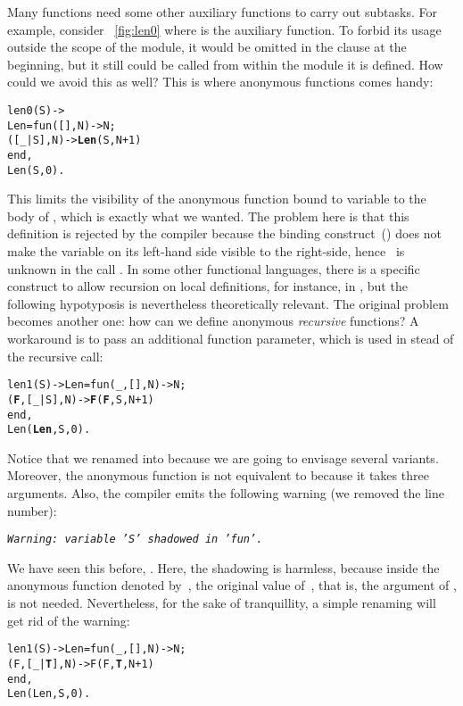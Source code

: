 Many functions need some other auxiliary functions to carry out
subtasks. For example, consider \fig~\vref{fig:len0} where
 is the auxiliary function. To forbid its usage
outside the scope of the module, it would be omitted in the
 clause at the beginning, but it still could be
called from within the module it is defined. How could we avoid this
as well? This is where anonymous functions comes handy:
\begin{alltt}
len0(S) -> 
  Len = fun(   [],N) -> N;
           ([\_|S],N) -> \textbf{Len}(S,N+1)\hfill% \emph{Does not compile}
        end,
  Len(S,0).
\end{alltt}
This limits the visibility of the anonymous function bound to variable
 to the body of , which is exactly what
we wanted. The problem here is that this definition is rejected by the
\Erlang compiler because the binding construct~(\erlcode{=}) does not
make the variable on its left\hyp{}hand side visible to the
right\hyp{}side, hence ~is unknown in the call
. In some other functional languages, there is a
specific construct to allow recursion on local definitions, for
instance,  in \OCaml, but the following hypotyposis
is nevertheless theoretically relevant. The original problem becomes
another one: how can we define anonymous \emph{recursive} functions? A
workaround is to pass an additional function parameter, which is used
in stead of the recursive call:
\begin{alltt}
len1(S) -> Len = fun(\_,   [],N) -> N;
                    (\textbf{F},[\_|S],N) -> \textbf{F}(\textbf{F},S,N+1)
                 end,
           Len(\textbf{Len},S,0).
\end{alltt}
Notice that we renamed  into 
because we are going to envisage several variants. Moreover, the
anonymous function is not equivalent to  because it
takes three arguments. Also, the compiler emits the following warning
(we removed the line number):
\begin{center}
\emph{\texttt{Warning: variable 'S' shadowed in 'fun'.}}
\end{center}
We have seen this before, . Here, the shadowing is
harmless, because inside the anonymous function denoted
by~, the original value of~, that is, the
argument of , is not needed. Nevertheless, for the
sake of tranquillity, a simple renaming will get rid of the warning:
\begin{alltt}
len1(S) -> Len = fun(\_,   [],N) -> N;
                    (F,[\_|\textbf{T}],N) -> F(F,\textbf{T},N+1)\hfill% \emph{Renaming}
                 end,
           Len(Len,S,0).
\end{alltt}
